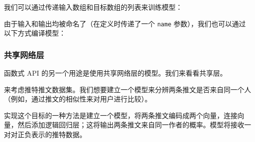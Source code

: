 我们可以通过传递输入数组和目标数组的列表来训练模型：

\begin{Shaded}
\begin{Highlighting}[]
          \OperatorTok{=}\OperatorTok{=}\NormalTok{)}
\end{Highlighting}
\end{Shaded}

由于输入和输出均被命名了（在定义时传递了一个 \texttt{name}
参数），我们也可以通过以下方式编译模型：

\begin{Shaded}
\begin{Highlighting}[]
\OperatorTok{=}\NormalTok{,}
     \OperatorTok{=}\NormalTok{\{}\NormalTok{: }\NormalTok{, }\NormalTok{: }\NormalTok{\},}
    \OperatorTok{=}\NormalTok{\{}\NormalTok{: }\NormalTok{: }\NormalTok{\})}

    \NormalTok{\{}
     \OperatorTok{=}\OperatorTok{=}\NormalTok{)}
\end{Highlighting}
\end{Shaded}


\subsubsection{共享网络层}\label{the-concept-of-layer-node}

函数式 API 的另一个用途是使用共享网络层的模型。我们来看看共享层。

来考虑推特推文数据集。我们想要建立一个模型来分辨两条推文是否来自同一个人（例如，通过推文的相似性来对用户进行比较）。

实现这个目标的一种方法是建立一个模型，将两条推文编码成两个向量，连接向量，然后添加逻辑回归层；这将输出两条推文来自同一作者的概率。模型将接收一对对正负表示的推特数据。

